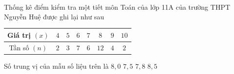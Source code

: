 \begin{ex}%
	Thống kê điểm kiểm tra một tiết môn Toán của lớp 11A của trường THPT Nguyễn Huệ được ghi lại như sau
	\begin{center}
		\begin{tabular}{|c|c|c|c|c|c|c|c|}
			\hline Giá trị $(x)$ & $4$ & $5$ & $6$ & $7$ & $8$ & $9$ & $10$ \\
			\hline Tần số $(n)$ & $2$ & $3$ & $7$ & $6$ & $12$ & $4$ & $2$ \\
			\hline
		\end{tabular} 
	\end{center}
	Số trung vị của mẫu số liệu trên là
	\choice
	{$8{,}0$}
	{\True $7{,}5$}
	{$7{,}8$}
	{$8{,}5$}
\end{ex}

